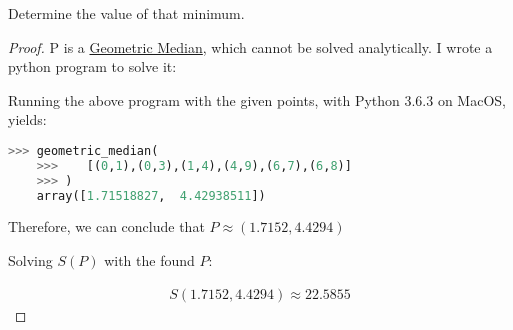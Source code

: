 Determine the value of that minimum.

\begin{proof}
    P is a \href{https://en.wikipedia.org/wiki/Geometric_median}{Geometric Median}, which cannot be solved analytically. I wrote a python program to solve it:

    

    Running the above program with the given points, with Python 3.6.3 on MacOS, yields: 

    \begin{lstlisting}[language=Python]
    >>> geometric_median(
    >>>    [(0,1),(0,3),(1,4),(4,9),(6,7),(6,8)]
    >>> )
    array([1.71518827,  4.42938511])
    \end{lstlisting}

    Therefore, we can conclude that $P \approx (1.7152, 4.4294)$

    Solving $S(P)$ with the found $P$:

    \begin{gather*}
    S(1.7152, 4.4294) \approx 22.5855
    \end{gather*}
\end{proof}